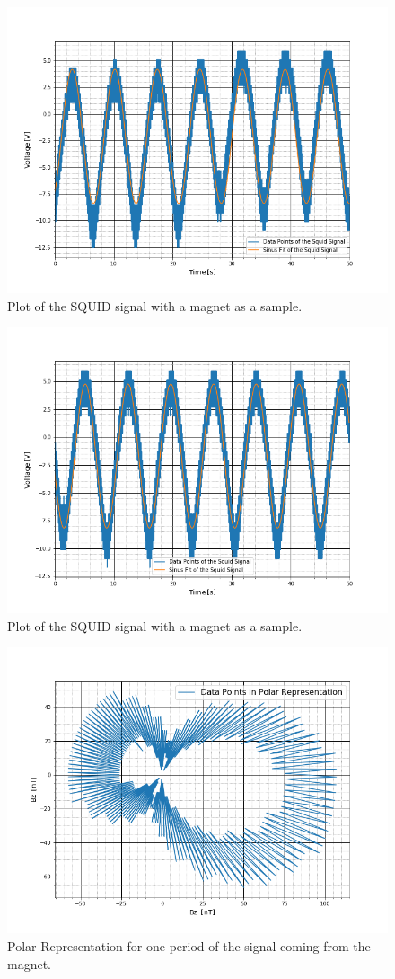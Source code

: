 \begin{figure}[ht]
	\includegraphics[scale=0.5]{Bild/P5_2}
	\centering
	\caption[SQUID signal of a Magnet 1]{Plot of the SQUID signal with a magnet as a sample.}
\end{figure}
\begin{figure}[ht]
	\includegraphics[scale=0.5]{Bild/P5_3}
	\centering
	\caption[SQUID signal of a Magnet 2]{Plot of the SQUID signal with a magnet as a sample.}
\end{figure}
\begin{figure}[ht]
	\includegraphics[scale=0.5]{Bild/Magnet}
	\centering
	\caption[Polar Representation for a Magnet]{Polar Representation for one period of the signal coming from the magnet.}
\end{figure}